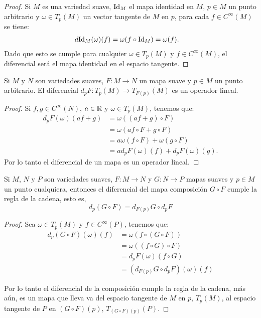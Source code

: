 \begin{proof}
	Si $M$ es una variedad suave, $\mathrm{Id}_M$ el mapa identidad en $M$, $p \in M$ un punto arbitrario y $\omega \in T_p(M)$ un vector tangente de $M$ en $p$, para cada $f \in C^{\infty}(M)$ se tiene:
	\begin{align*}
		d\mathrm{Id}_{M}(\omega)(f) & = \omega(f \circ \mathrm{Id}_M) = \omega(f).
	\end{align*}
	Dado que esto se cumple para cualquier $\omega \in T_p(M)$ y $f \in C^{\infty}(M)$, el diferencial será el mapa identidad en el espacio tangente.
\end{proof}

\begin{lemma}
	Si $M$ y $N$ son variedades suaves, $F: M \to N$ un mapa suave y $p \in M$ un punto arbitrario. El diferencial $d_pF: T_p(M) \to T_{F(p)}(M)$ es un operador lineal.
\end{lemma}

\begin{proof}
	Si $f,g \in C^{\infty}(N)$, $a \in \mathbb{R}$ y $\omega \in T_{p}(M)$, tenemos que:
	\begin{align*}
		d_pF(\omega)(af + g) & = \omega((af + g) \circ F)               \\
		                     & = \omega (af \circ F + g \circ F)        \\
		                     & = a\omega(f \circ F) + \omega(g \circ F) \\
		                     & = a d_pF (\omega)(f) + d_pF(\omega)(g).
	\end{align*}
	Por lo tanto el diferencial de un mapa es un operador lineal.
\end{proof}

\begin{lemma}\label{Lemma: Regla de la Cadena para Diferenciales}
	Si $M$, $N$ y $P$ son variedades suaves, $F: M \to N$ y $G: N \to P$ mapas suaves y $p \in M$ un punto cualquiera, entonces el diferencial del mapa composición $G \circ F$ cumple la regla de la cadena, esto es,
	\[
		d_p(G \circ F) = d_{F(p)}G \circ d_pF
	\]
\end{lemma}

\begin{proof}
	Sea $\omega \in T_p(M)$ y $f \in C^{\infty}(P)$, tenemos que:
	\begin{align*}
		d_p(G \circ F) (\omega)(f) & = \omega(f \circ (G \circ F))       \\
		                           & = \omega ((f \circ G) \circ F)      \\
		                           & = d_pF(\omega)(f \circ G)           \\
		                           & = (d_{F(p)}G \circ d_pF)(\omega)(f)
	\end{align*}

	Por lo tanto el diferencial de la composición cumple la regla de la cadena, más aún, es un mapa que lleva va del espacio tangente de $M$
	en $p$, $T_p(M)$, al espacio tangente de $P$ en $(G \circ F)(p)$, $T_{(G \circ F)(p)}(P)$.
\end{proof}

